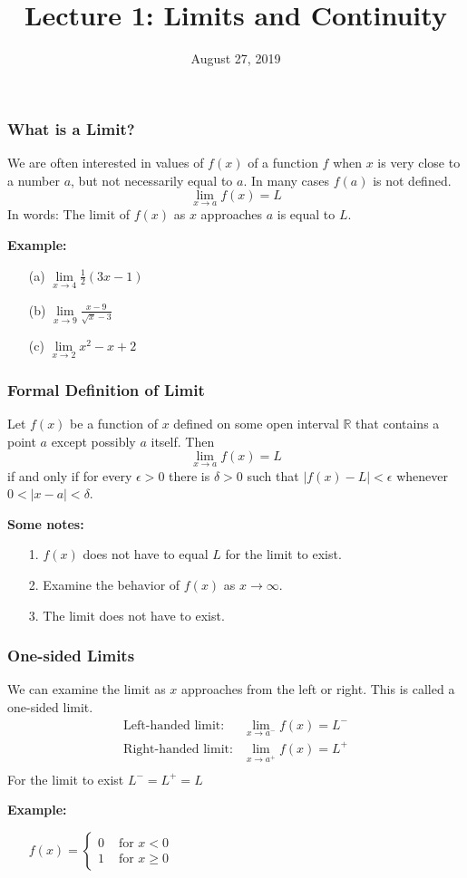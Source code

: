 \documentclass{beamer}
\title{\textbf{Lecture 1: Limits and Continuity}}
\date{August 27, 2019}
\begin{document}
	
\frame{\titlepage}

\begin{frame}
\frametitle{\textbf{What is a Limit?}}
We are often interested in values of $f(x)$ of a function $f$ when $x$ is very close to a number $a$, but not necessarily equal to $a$. In many cases $f(a)$ is not defined.
$$\lim\limits_{x \to a} f(x) = L$$
In words: The limit of $f(x)$ as $x$ approaches $a$ is equal to $L$.

\vspace{12pt}

\textbf{Example:}
\begin{itemize}
	\item[(a)] $\lim\limits_{x\to 4} \frac{1}{2}(3x-1)$
	\item[(b)] $\lim\limits_{x\to 9} \frac{x-9}{\sqrt{x}-3}$
	\item[(c)] $\lim\limits_{x\to 2} x^2-x+2$
\end{itemize}
\end{frame}

\begin{frame}
\frametitle{\textbf{Formal Definition of Limit}}
Let $f(x)$ be a function of $x$ defined on some open interval $\mathbb{R}$ that contains a point $a$ except possibly $a$ itself. Then
$$\lim\limits_{x \to a} f(x) = L$$ if and only if for every $\epsilon > 0$ there is $\delta > 0$ such that $|f(x) - L| < \epsilon$ whenever $0 < |x-a| < \delta$.

\vspace{12pt}

\textbf{Some notes:}
\begin{itemize}
	\item[1.] $f(x)$ does not have to equal $L$ for the limit to exist.
	\item[2.] Examine the behavior of $f(x)$ as $x \to \infty$.
	\item[3.] The limit does not have to exist.
\end{itemize}
\end{frame}

\begin{frame}
\frametitle{\textbf{One-sided Limits}}
We can examine the limit as $x$ approaches from the left or right. This is called a one-sided limit.
\begin{eqnarray*}
\mbox{Left-handed limit}: & \lim\limits_{x \to a^-} f(x) = L^-\\
\mbox{Right-handed limit}: & \lim\limits_{x \to a^+} f(x) = L^+\\
\end{eqnarray*}
For the limit to exist $L^- = L^+ = L$

\vspace{12pt}

\textbf{Example:}
\begin{itemize}
\item[]
$f(x)=  \begin{cases} 
0 & \mbox{ for } x <0\\
1 & \mbox{ for } x \geq 0
\end{cases}  $
\end{itemize}
\end{frame}
\end{document}
